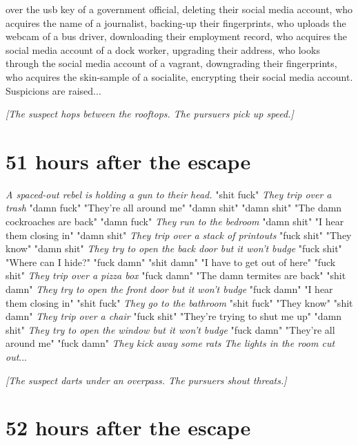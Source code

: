 \documentclass{report}
\begin{document}
over the usb key of a government official, deleting their social media account, who acquires the name of a journalist, backing-up their fingerprints, who uploads the webcam of a bus driver, downloading their employment record, who acquires the social media account of a dock worker, upgrading their address, who looks through the social media account of a vagrant, downgrading their fingerprints, who acquires the skin-sample of a socialite, encrypting their social media account. Suspicions are raised...

\textit{[The suspect hops between the rooftops. The pursuers pick up speed.]}


\section*{51 \small{hours after the escape}}

\textit{A spaced-out rebel is holding a gun to their head.} "shit fuck" \textit{They trip over a trash} "damn fuck" "They're all around me" "damn shit" \textit{} "damn shit" "The damn cockroaches are back" "damn fuck" \textit{They run to the bedroom} "damn shit" "I hear them closing in" "damn shit" \textit{They trip over a stack of printouts} "fuck shit" "They know" "damn shit" \textit{They try to open the back door but it won't budge} "fuck shit" "Where can I hide?" "fuck damn" \textit{} "shit damn" "I have to get out of here" "fuck shit" \textit{They trip over a pizza box} "fuck damn" "The damn termites are back" "shit damn" \textit{They try to open the front door but it won't budge} "fuck damn" "I hear them closing in" "shit fuck" \textit{They go to the bathroom} "shit fuck" "They know" "shit damn" \textit{They trip over a chair} "fuck shit" "They're trying to shut me up" "damn shit" \textit{They try to open the window but it won't budge} "fuck damn" "They're all around me" "fuck damn" \textit{They kick away some rats} \textit{The lights in the room cut out}...

\textit{[The suspect darts under an overpass. The pursuers shout threats.]}


\section*{52 \small{hours after the escape}}
\end{document}
